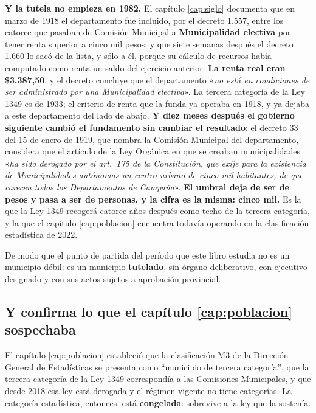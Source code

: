 \begin{cautela}
\textbf{Y la tutela no empieza en 1982.} El capítulo \ref{cap:siglo} documenta que en marzo de 1918 el departamento fue incluido, por el decreto 1.557, entre los catorce que pasaban de Comisión Municipal a \textbf{Municipalidad electiva} por tener renta superior a cinco mil pesos; y que siete semanas después el decreto 1.660 lo sacó de la lista, y sólo a él, porque su cálculo de recursos había computado como renta un saldo del ejercicio anterior. \textbf{La renta real eran \$3.387,50}, y el decreto concluye que el departamento «\textit{no está en condiciones de ser administrado por una Municipalidad electiva}». La tercera categoría de la Ley 1349 es de 1933; el criterio de renta que la funda ya operaba en 1918, y ya dejaba a este departamento del lado de abajo. \textbf{Y diez meses después el gobierno siguiente cambió el fundamento sin cambiar el resultado}: el decreto 33 del 15 de enero de 1919, que nombra la Comisión Municipal del departamento, considera que el artículo de la Ley Orgánica en que se creaban municipalidades «\textit{ha sido derogado por el art.\ 175 de la Constitución, que exije para la existencia de Municipalidades autónomas un centro urbano de cinco mil habitantes, de que carecen todos los Departamentos de Campaña}». \textbf{El umbral deja de ser de pesos y pasa a ser de personas, y la cifra es la misma: cinco mil.} Es la que la Ley 1349 recogerá catorce años después como techo de la tercera categoría, y la que el capítulo \ref{cap:poblacion} encuentra todavía operando en la clasificación estadística de 2022.

De modo que el punto de partida del período que este libro estudia no es un municipio débil: es un municipio \textbf{tutelado}, sin órgano deliberativo, con ejecutivo designado y con sus actos sujetos a aprobación provincial.
\end{cautela}

\subsection*{Y confirma lo que el capítulo \ref{cap:poblacion} sospechaba}

El capítulo \ref{cap:poblacion} estableció que la clasificación M3 de la Dirección General de Estadísticas se presenta como ``municipio de tercera categoría'', que la tercera categoría de la Ley 1349 correspondía a las Comisiones Municipales, y que desde 2018 esa ley está derogada y el régimen vigente no tiene categorías. La categoría estadística, entonces, está \textbf{congelada}: sobrevive a la ley que la sostenía.

